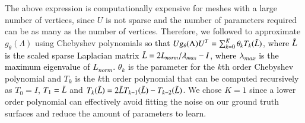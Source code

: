 \documentclass[times,review,preprint,authoryear]{elsarticle}
\begin{document}
The above expression is computationally expensive for meshes with a large number of vertices, since $U$ is not sparse and the number of parameters required can be as many as the number of vertices. Therefore, we followed \cite{Defferrard2016} to approximate $g_\theta(\Lambda)$ using Chebyshev polynomials \textcolor{black}{so that} $Ug_\theta(\Lambda)U^T = \sum_{k=0}^K \theta_k T_k(\Tilde{L})$, \textcolor{black}{where $\Tilde{L}$ is the scaled sparse Laplacian matrix $\Tilde{L} = 2L_{norm}/\lambda_{max} - I$, where $\lambda_{max}$ is the maximum eigenvalue of $L_{norm}$.} \textcolor{black}{$\theta_k$} is the parameter for the $k$th order Chebyshev polynomial and $T_k$ is the $k$th order polynomial that can be computed recursively as $T_0 = I$, $T_1 = \Tilde{L}$ and $T_k(\Tilde{L}) = 2 \Tilde{L} T_{k-1}(\Tilde{L}) - T_{k-2}(\Tilde{L})$. We chose $K=1$ since a lower order polynomial can effectively avoid fitting the noise on our ground truth surfaces and reduce the amount of parameters to learn.  
\end{document}
